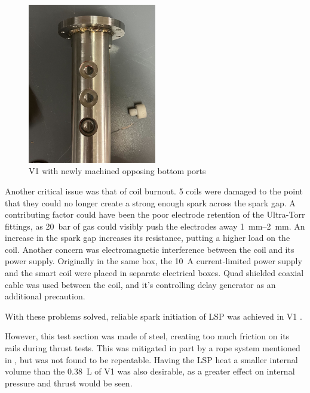 \begin{figure}[!ht]
    \centering
    \includegraphics[width=0.5\textwidth]{assets/5 discussion/Bottom ports machined.jpg}
    \caption{V1 with newly machined opposing bottom ports}
    \label{fig: V1 opposing ports}
\end{figure}


Another critical issue was that of coil burnout. 5 coils were damaged to the point that they could no longer create a strong enough spark across the spark gap. A contributing factor could have been the poor electrode retention of the Ultra-Torr fittings, as \qty{20}{bar} of gas could visibly push the electrodes away \qtyrange{1}{2}{mm}. An increase in the spark gap increases its resistance, putting a higher load on the coil. Another concern was electromagnetic interference between the coil and its power supply. Originally in the same box, the \qty{10}{A} current-limited power supply and the smart coil were placed in separate electrical boxes. Quad shielded coaxial cable was used between the coil, and it's controlling delay generator as an additional precaution. 


With these problems solved, reliable spark initiation of LSP was achieved in V1 . 

However, this test section was made of steel, creating too much friction on its rails during thrust tests. This was mitigated in part by a rope system mentioned in \textcite{duplayArgonLaserPlasmaThruster2024a}, but was not found to be repeatable. Having the LSP heat a smaller internal volume than the \qty{0.38}{L} of V1 was also desirable, as a greater effect on internal pressure and thrust would be seen.

